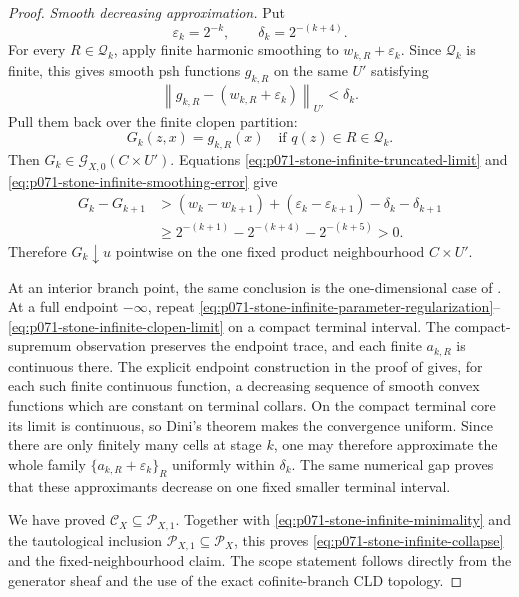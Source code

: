 \begin{proof}
\medskip\noindent
\emph{Smooth decreasing approximation.}
Put
\[
                         \varepsilon_k=2^{-k},
                    \qquad \delta_k=2^{-(k+4)}.
\]
For every \(R\in\mathscr Q_k\), apply finite harmonic smoothing to
\(w_{k,R}+\varepsilon_k\).  Since \(\mathscr Q_k\) is finite, this gives
smooth psh functions \(g_{k,R}\) on the same \(U'\) satisfying
\begin{equation}
 \left\|g_{k,R}-(w_{k,R}+\varepsilon_k)\right\|_{U'}
                               <\delta_k .
 \label{eq:p071-stone-infinite-smoothing-error}
\end{equation}
Pull them back over the finite clopen partition:
\[
 G_k(z,x)=g_{k,R}(x)
 \quad\text{if }q(z)\in R\in\mathscr Q_k.
\]
Then \(G_k\in\mathcal G_{X,0}(C\times U')\).  Equations
\eqref{eq:p071-stone-infinite-truncated-limit} and
\eqref{eq:p071-stone-infinite-smoothing-error} give
\begin{align*}
 G_k-G_{k+1}
 &>(w_k-w_{k+1})+(\varepsilon_k-\varepsilon_{k+1})
                         -\delta_k-\delta_{k+1}\\
 &\geq2^{-(k+1)}-2^{-(k+4)}-2^{-(k+5)}>0.
\end{align*}
Therefore \(G_k\downarrow u\) pointwise on the one fixed product
neighbourhood \(C\times U'\).

At an interior branch point, the same conclusion is the one-dimensional
case of .  At a full endpoint
\(-\infty\), repeat
\eqref{eq:p071-stone-infinite-parameter-regularization}--%
\eqref{eq:p071-stone-infinite-clopen-limit} on a compact terminal
interval.  The compact-supremum observation preserves the endpoint
trace, and each finite \(a_{k,R}\) is continuous there.  The explicit
endpoint construction in the proof of
 gives, for each such
finite continuous function, a decreasing sequence of smooth convex
functions which are constant on terminal collars.  On the compact
terminal core its limit is continuous, so Dini's theorem makes the
convergence uniform.  Since there are only finitely many cells at stage
\(k\), one may therefore approximate the whole family
\(\{a_{k,R}+\varepsilon_k\}_R\) uniformly within \(\delta_k\).
The same numerical gap proves that these approximants decrease on one
fixed smaller terminal interval.

We have proved
\(\mathcal C_X\subseteq\mathcal P_{X,1}\).  Together with
\eqref{eq:p071-stone-infinite-minimality} and the tautological inclusion
\(\mathcal P_{X,1}\subseteq\mathcal P_X\), this proves
\eqref{eq:p071-stone-infinite-collapse} and the fixed-neighbourhood
claim.  The scope statement follows directly from the generator sheaf
and the use of the exact cofinite-branch CLD topology.
\end{proof}
